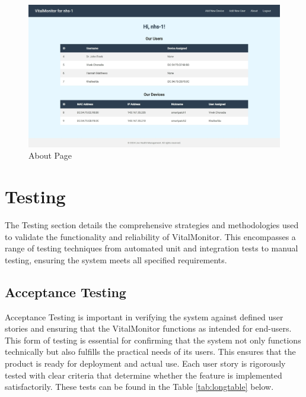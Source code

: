 \begin{figure}[h!]
    \centering
    \includegraphics[width=1\linewidth]{images/dashboard-2.jpeg}
    \caption{About Page}
    \label{fig:about-page}
\end{figure}

\clearpage
\section{Testing}
The Testing section details the comprehensive strategies and methodologies used to validate the functionality and reliability of VitalMonitor. This encompasses a range of testing techniques from automated unit and integration tests to manual testing, ensuring the system meets all specified requirements.

\subsection {Acceptance Testing}
Acceptance Testing is important in verifying the system against defined user stories and ensuring that the VitalMonitor functions as intended for end-users. This form of testing is essential for confirming that the system not only functions technically but also fulfills the practical needs of its users. This ensures that the product is ready for deployment and actual use. Each user story is rigorously tested with clear criteria that determine whether the feature is implemented satisfactorily. These tests can be found in the Table \ref{tab:longtable} below.


